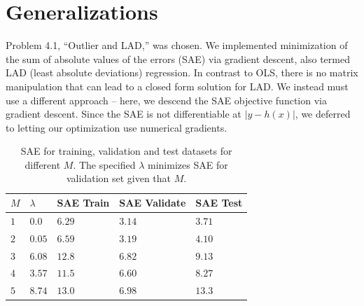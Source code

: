 \documentclass[10pt]{article}
\begin{document}
\section{Generalizations}
Problem 4.1, ``Outlier and LAD,'' was chosen.  We implemented minimization of the sum of absolute values of the errors (SAE) via gradient descent, also termed LAD (least absolute deviations) regression.  In contrast to OLS, there is no matrix manipulation that can lead to a closed form solution for LAD.  We instead must use a different approach -- here, we descend the SAE objective function via gradient descent.  Since the SAE is not differentiable at $| y - h(x)|$, we deferred to letting our optimization use numerical gradients.

\begin{table}
\begin{tabular}{|l|l|l|l|l|}
\hline 
$M$ & $\lambda$ & SAE Train & SAE Validate & SAE Test \\ \hline
$1$ & $0.0$ & $6.29$ & $3.14$ & $3.71$ \\ \hline
$2$ & $0.05$ & $6.59$ & $3.19$ & $4.10$ \\ \hline
$3$ & $6.08$ & $12.8$ & $6.82$ & $9.13$ \\ \hline
$4$ & $3.57$ & $11.5$ & $6.60$ & $8.27$ \\ \hline
$5$ & $8.74$ & $13.0$ & $6.98$ & $13.3$ \\
\hline
\end{tabular}
\label{model-selection}
\caption{SAE for training, validation and test datasets for different $M$. The specified $\lambda$ minimizes SAE for validation set given that $M$.}
\end{table}





\nocite{langley00}



\end{document}
